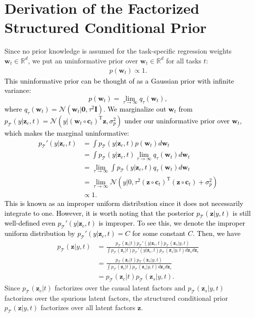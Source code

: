 \documentclass[10pt]{article} %
\theoremstyle{plain}
\theoremstyle{definition}
\begin{document}
\section{Derivation of the Factorized Structured Conditional Prior}\label{appendix:uninformative prior}
Since no prior knowledge is assumed for the task-specific regression weights $\mathbf{w}_t\in\mathbb{R}^d$, we put an uninformative prior over $\mathbf{w}_t\in\mathbb{R}^d$ for all tasks $t$:
\begin{align}
    p(\mathbf{w}_t)\propto 1.
\end{align}
\textcolor{black}{
This uninformative prior can be thought of as a Gaussian prior with infinite variance:
\begin{equation}
    p(\mathbf{w}_t)=\lim_{\tau\to\infty}q_{\tau}(\mathbf{w}_t),
\end{equation}
where $q_{\tau}(\mathbf{w}_t)=\mathcal{N}(\mathbf{w}_t|\mathbf{0},\tau^2\mathbf{I})$. We marginalize out $\mathbf{w}_t$ from $p_{\mathcal{T}}(y|\mathbf{z}_c,t) =\mathcal{N}(y|(\mathbf{w}_t\circ\mathbf{c}_t)^{\text{T}}\mathbf{z},\sigma_{p}^{2})$ under our uninformative prior over $\mathbf{w}_t$, which makes the marginal uninformative:
\begin{align}
    p_{\mathcal{T}}'(y|\mathbf{z}_c,t)
    &=\int p_{\mathcal{T}}(y|\mathbf{z}_c,t)p(\mathbf{w}_t)d\mathbf{w}_t \\
    &= \int p_{\mathcal{T}}(y|\mathbf{z}_c,t)\lim_{\tau\to\infty}q_{\tau}(\mathbf{w}_t)d\mathbf{w}_t \\
    &=\lim_{\tau\to\infty}\int p_{\mathcal{T}}(y|\mathbf{z}_c,t)q_{\tau}(\mathbf{w}_t)d\mathbf{w}_t\\
    &=\lim_{\tau\to\infty}\mathcal{N}(y|0,\tau^2(\mathbf{z}\circ\mathbf{c}_t)^{\text{T}}(\mathbf{z}\circ\mathbf{c}_t)+\sigma_p^2)\\
    &\propto 1.
\end{align}
This is known as an improper uniform distribution since it does not necessarily integrate to one. However, it is worth noting that the posterior $p_{\mathcal{T}}(\mathbf{z}|y,t)$ is still well-defined even $p_{\mathcal{T}}'(y|\mathbf{z}_c,t)$ is improper. To see this, we denote the improper uniform distribution by $p_{\mathcal{T}}'(y|\mathbf{z}_c,t)=C$ for some constant $C$. Then, we have
}
\begin{align}
    p_{\mathcal{T}}(\mathbf{z}|y,t)
    &=\frac{p_{\mathcal{T}}(\mathbf{z}_c|t)p_{\mathcal{T}}'(y|\mathbf{z}_c,t)p_{\mathcal{T}}(\mathbf{z}_s|y,t)}{\int p_{\mathcal{T}}(\mathbf{z}_c|t)p_{\mathcal{T}}'(y|\mathbf{z}_c,t)p_{\mathcal{T}}(\mathbf{z}_s|y,t)d\mathbf{z}_s d\mathbf{z}_c}\\
    &=\frac{p_{\mathcal{T}}(\mathbf{z}_c|t)p_{\mathcal{T}}(\mathbf{z}_s|y,t)}{\int p_{\mathcal{T}}(\mathbf{z}_c|t)p_{\mathcal{T}}(\mathbf{z}_s|y,t)d\mathbf{z}_s d\mathbf{z}_c}\\
    &=p_{\mathcal{T}}(\mathbf{z}_c|t)p_{\mathcal{T}}(\mathbf{z}_s|y,t).
\end{align}
Since $p_{\mathcal{T}}(\mathbf{z}_c|t)$ factorizes over the causal latent factors and $p_{\mathcal{T}}(\mathbf{z}_s|y,t)$ factorizes over the spurious latent factors, the structured conditional prior $p_{\mathcal{T}}(\mathbf{z}|y,t)$ factorizes over all latent factors $\mathbf{z}$.
\end{document}
